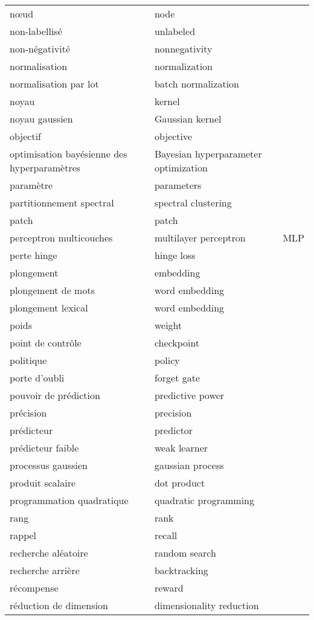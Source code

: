 \begin{longtable}{p{} p{} p{}}
nœud & node &  \\ 
non-labellisé & unlabeled &  \\ 
non-négativité & nonnegativity &  \\ 
normalisation & normalization &  \\ 
normalisation par lot & batch normalization &  \\ 
noyau & kernel &  \\ 
noyau gaussien & Gaussian kernel &  \\ 
objectif & objective &  \\ 
optimisation bayésienne des hyperparamètres & Bayesian hyperparameter optimization &  \\ 
paramètre & parameters &  \\ 
partitionnement spectral & spectral clustering &  \\ 
patch & patch &  \\ 
perceptron multicouches & multilayer perceptron & MLP \\ 
perte hinge & hinge loss &  \\ 
plongement & embedding &  \\ 
plongement de mots & word embedding &  \\ 
plongement lexical & word embedding &  \\ 
poids & weight &  \\ 
point de contrôle & checkpoint &  \\ 
politique & policy &  \\ 
porte d'oubli & forget gate &  \\ 
pouvoir de prédiction & predictive power &  \\ 
précision & precision &  \\ 
prédicteur & predictor &  \\ 
prédicteur faible & weak learner &  \\ 
processus gaussien & gaussian process &  \\ 
produit scalaire & dot product &  \\ 
programmation quadratique & quadratic programming &  \\ 
rang & rank &  \\ 
rappel & recall &  \\ 
recherche aléatoire & random search &  \\ 
recherche arrière & backtracking &  \\ 
récompense & reward &  \\ 
réduction de dimension & dimensionality reduction &  \\ 

\end{longtable}
